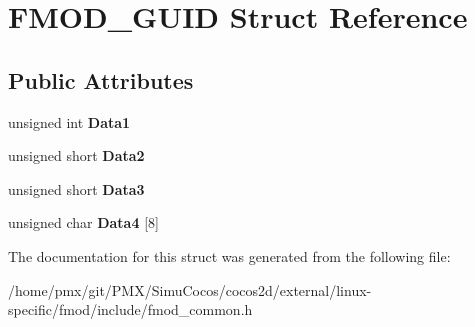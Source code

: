\hypertarget{structFMOD__GUID}{}\section{F\+M\+O\+D\+\_\+\+G\+U\+ID Struct Reference}
\label{structFMOD__GUID}
\subsection*{Public Attributes}
\begin{DoxyCompactItemize}
\item 
\mbox{\label{structFMOD__GUID_ade5cc5a3c9665147a488c8a9e2ea211c}} 
unsigned int {\bfseries Data1}
\item 
\mbox{\label{structFMOD__GUID_ac5805cdbaf5cfa2113d637e11f6ad36e}} 
unsigned short {\bfseries Data2}
\item 
\mbox{\label{structFMOD__GUID_a98f6f2f06cad235236cbc86099aa4e96}} 
unsigned short {\bfseries Data3}
\item 
\mbox{\label{structFMOD__GUID_aa909de92a1f7dd124c295ab966045c26}} 
unsigned char {\bfseries Data4} \mbox{[}8\mbox{]}
\end{DoxyCompactItemize}


The documentation for this struct was generated from the following file\+:\begin{DoxyCompactItemize}
\item 
/home/pmx/git/\+P\+M\+X/\+Simu\+Cocos/cocos2d/external/linux-\/specific/fmod/include/fmod\+\_\+common.\+h\end{DoxyCompactItemize}
